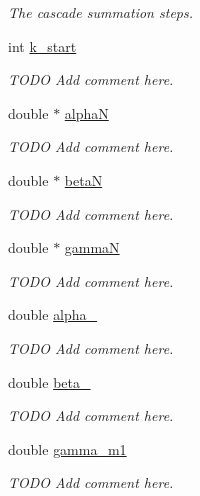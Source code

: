 \begin{CompactItemize}
\begin{CompactList}\small\item\em The cascade summation steps. \item\end{CompactList}\item 
int \hyperlink{structfpt__data_f8064f466928c78c4a530fb43dbc7663}{k\_\-start}
\begin{CompactList}\small\item\em TODO Add comment here. \item\end{CompactList}\item 
double $\ast$ \hyperlink{structfpt__data_eafd070ebb2e7c345750303d34a68890}{alphaN}
\begin{CompactList}\small\item\em TODO Add comment here. \item\end{CompactList}\item 
double $\ast$ \hyperlink{structfpt__data_eace6f72b465a9bd2d8c399c69b7d9a9}{betaN}
\begin{CompactList}\small\item\em TODO Add comment here. \item\end{CompactList}\item 
double $\ast$ \hyperlink{structfpt__data_a6986fbcdce61cdbaf09c92632880feb}{gammaN}
\begin{CompactList}\small\item\em TODO Add comment here. \item\end{CompactList}\item 
double \hyperlink{structfpt__data_13e1adc5987793ecf5a4b633e9100df7}{alpha\_}
\begin{CompactList}\small\item\em TODO Add comment here. \item\end{CompactList}\item 
double \hyperlink{structfpt__data_bd27c835f0b1cdfd1888ff0402d766b3}{beta\_}
\begin{CompactList}\small\item\em TODO Add comment here. \item\end{CompactList}\item 
double \hyperlink{structfpt__data_041e7eddf4d86b6425c2c94548d2c905}{gamma\_\-m1}
\begin{CompactList}\small\item\em TODO Add comment here. \item\end{CompactList}\item 

\end{CompactItemize}
